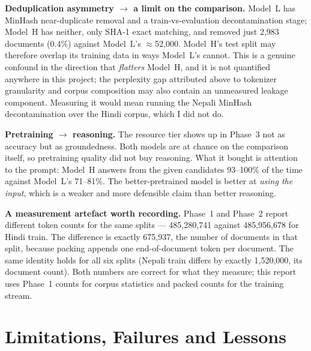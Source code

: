 \documentclass[10pt]{article}
\begin{document}
\textbf{Deduplication asymmetry $\rightarrow$ a limit on the comparison.} Model~L has
MinHash near-duplicate removal and a train-vs-evaluation decontamination stage;
Model~H has neither, only SHA-1 exact matching, and removed just 2{,}983 documents
(0.4\%) against Model~L's $\approx$52{,}000. Model~H's test split may therefore
overlap its training data in ways Model~L's cannot. This is a genuine confound in the
direction that \emph{flatters} Model~H, and it is not quantified anywhere in this
project; the perplexity gap attributed above to tokenizer granularity and corpus
composition may also contain an unmeasured leakage component. Measuring it would mean
running the Nepali MinHash decontamination over the Hindi corpus, which I did not do.

\textbf{Pretraining $\rightarrow$ reasoning.} The resource tier shows up in Phase~3
not as accuracy but as groundedness. Both models are at chance on the comparison
itself, so pretraining quality did not buy reasoning. What it bought is attention to
the prompt: Model~H answers from the given candidates 93--100\% of the time against
Model~L's 71--81\%. The better-pretrained model is better at \emph{using the input},
which is a weaker and more defensible claim than better reasoning.

\textbf{A measurement artefact worth recording.}
\label{sec:tokencounts}
Phase~1 and Phase~2 report different token counts for the same splits --- 485{,}280{,}741
against 485{,}956{,}678 for Hindi train. The difference is exactly 675{,}937, the
number of documents in that split, because packing appends one end-of-document token
per document. The same identity holds for all six splits (Nepali train differs by
exactly 1{,}520{,}000, its document count). Both numbers are correct for what they
measure; this report uses Phase~1 counts for corpus statistics and packed counts for
the training stream.

\section{Limitations, Failures and Lessons}
\end{document}
